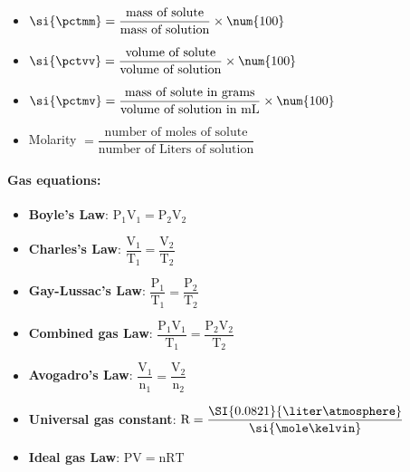 \documentclass[9pt]{article}
\begin{document}
\begin{multicols}{2}
\begin{itemize}
    \item  \( \si{\pctmm}  = \dfrac{\text{mass of solute}}{\text{mass of solution}} \times \num{100}  \)
    \item \(\si{\pctvv} = \dfrac{\text{volume of solute}}{\text{volume of solution}} \times \num{100} \)
    \item \(\si{\pctmv}= \dfrac{\text{mass of solute in grams}}{\text{volume of solution in mL}} \times \num{100} \)
    \item Molarity \(= \dfrac{\text{number of moles of solute}}{\text{number of Liters of solution}}\)
\end{itemize}
\vspace{0.5cm}

\paragraph{\textsf{Gas equations:}}

\begin{itemize}
    \item \textbf{Boyle's Law}:    \( \mathrm{P_1 V_1} = \mathrm{P_2 V_2}  \)
    \item \textbf{Charles's Law}: \(\dfrac{\mathrm{V_1}}{\mathrm{T_1}} = \mathrm{\dfrac{V_2}{T_2}}\)
    \item \textbf{Gay-Lussac's Law}: \(\mathrm{\dfrac{P_1}{T_1} = \dfrac{P_2}{T_2}} \)
    \item \textbf{Combined gas Law}: \(\mathrm{\dfrac{P_1 V_1}{T_1} = \dfrac{P_2 V_2}{T_2}} \)
    \item \textbf{Avogadro's Law}: \( \mathrm{\dfrac{V_1}{n_1} = \dfrac{V_2}{n_2}} \)
    \item \textbf{Universal gas constant}: \( \mathrm{R} = \dfrac{\SI{0.0821}{\liter \atmosphere}}{\si{\mole \kelvin}}  \)
    \item \textbf{Ideal gas Law}: \( \mathrm{PV = nRT} \)
\end{itemize}
\end{multicols}
\end{document}
